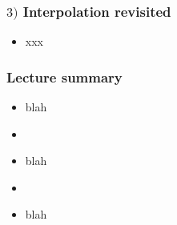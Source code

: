 \documentclass[english,14pt]{beamer}
\begin{document}

\begin{frame}[fragile]

\frametitle{$3)$ Interpolation revisited}

\begin{itemize}
	\item xxx
\end{itemize}

\end{frame}


\begin{frame}[fragile]

\frametitle{Lecture summary}
\begin{itemize}
	\item blah
	\item[]
	
	\item blah

	\item[]
	
	\item blah	
\end{itemize}

\end{frame}
\end{document}
